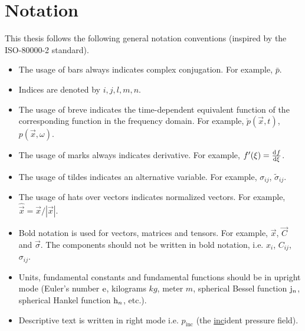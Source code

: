 \chapter*{Notation}
%
This thesis follows the following general notation conventions (inspired by the ISO-80000-2 standard).
\begin{itemize}
	\item The usage of bars always indicates complex conjugation. For example, $\bar{p}$.
	\item Indices are denoted by $i,j,l,m,n$.
	\item The usage of breve indicates the time-dependent equivalent function of the corresponding function in the frequency domain. For example, $\breve{p}(\vec{x},t)$, $p(\vec{x},\omega)$.
	\item The usage of marks always indicates derivative. For example, $f'(\xi) = \frac{\mathrm{d}^{}f}{\mathrm{d} \xi^{}}$.
	\item The usage of tildes indicates an alternative variable. For example, $\sigma_{ij}$, $\tilde{\sigma}_{ij}$.
	\item The usage of hats over vectors indicates normalized vectors. For example, $\hat{\vec{x}}=\vec{x}/|\vec{x}|$.
	\item Bold notation is used for vectors, matrices and tensors. For example, $\vec{x}$, $\vec{C}$ and $\vec{\sigma}$. The components should not be written in bold notation, i.e. $x_i$, $C_{ij}$, $\sigma_{ij}$.
	\item Units, fundamental constants and fundamental functions should be in upright mode (Euler's number $\mathrm{e}$, kilograms $\si{kg}$, meter $\si{m}$, spherical Bessel function $\mathrm{j}_n$, spherical Hankel function $\mathrm{h}_n$, etc.).
	\item Descriptive text is written in right mode i.e. $p_{\mathrm{inc}}$ (the \underline{inc}ident pressure field).
\end{itemize}


